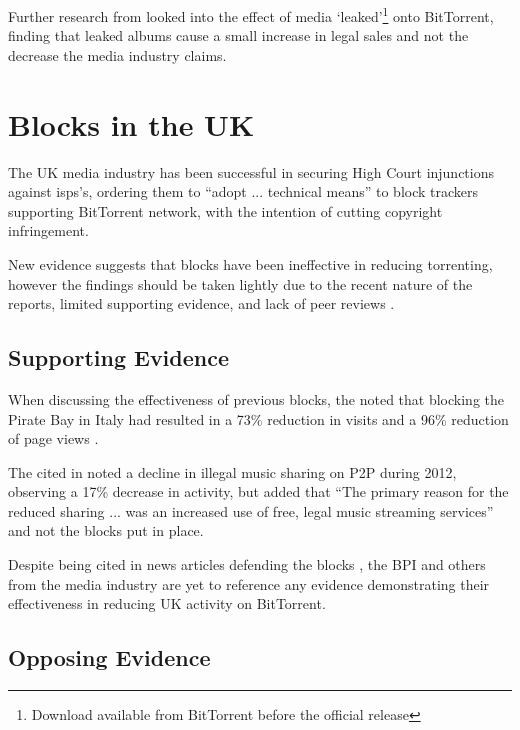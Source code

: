 Further research from \citet{hammond13} looked into the effect of media `leaked'\footnote{Download available from BitTorrent before the official release} onto BitTorrent, finding that leaked albums cause a small increase in legal sales and not the decrease the media industry claims.

\section{Blocks in the UK}

The UK media industry has been successful in securing High Court injunctions against \glspl{isp}'s, ordering them to ``adopt ... technical means'' \citep{bpivsukisps} to block trackers supporting BitTorrent network, with the intention of cutting copyright infringement. 

New evidence suggests that blocks have been ineffective in reducing torrenting, however the findings should be taken lightly due to the recent nature of the reports, limited supporting evidence, and lack of peer reviews \citep{bbc2012piratebay, duah2013injunction}. %


\subsection{Supporting Evidence}

When discussing the effectiveness of previous blocks, the \citet{bpivsukisps} noted that blocking the Pirate Bay in Italy had resulted in a 73\% reduction in visits and a 96\% reduction of page views \citep{meale2013triple}.

The \citet{ndpgroup2013} cited in \citet{ribeiro2013court} noted a decline in illegal music sharing on P2P during 2012, observing a 17\% decrease in activity, but added that ``The primary reason for the reduced sharing ... was an increased use of free, legal music streaming services'' and not the blocks put in place.

Despite being cited in news articles defending the blocks \citep{bbc2012piratebay}, the BPI and others from the media industry are yet to reference any evidence demonstrating their effectiveness in reducing UK activity on BitTorrent.

\subsection{Opposing Evidence}

